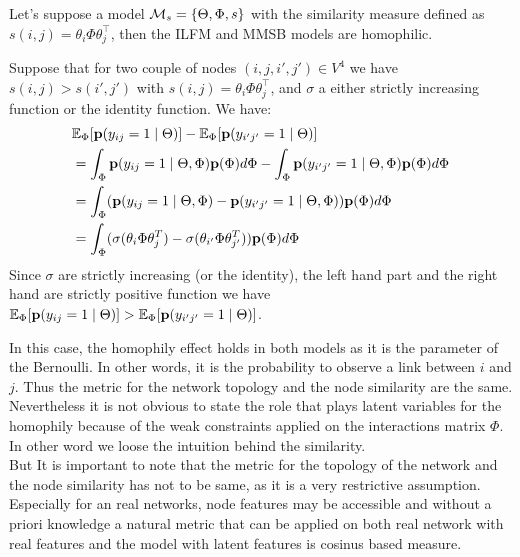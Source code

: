 \begin{proposition}[]
Let's suppose a model $ \mathcal{M}_s=\{\Theta, \Phi, s\}$ with the similarity measure defined as $s(i,j) = \theta_i \Phi \theta_j^\top$, then the ILFM and MMSB models are homophilic.
\end{proposition}

\begin{IEEEproof}
Suppose that for two couple of nodes $(i,j,i',j') \in V^4$ we have $s(i,j) > s(i',j')$ with $s(i,j) =\theta_i \Phi \theta_j^\top$, and $\sigma$ a either strictly increasing function or the identity function. We have:
\begin{align}
&\mathbb{E}_\Phi[\mathbf{p}(y_{ij}=1 \mid \Theta)] - \mathbb{E}_\Phi[\mathbf{p}(y_{i'j'} = 1  \mid \Theta)] \\
&= \int_{\Phi} \mathbf{p}(y_{ij}=1 \mid \Theta, \Phi ) \mathbf{p}(\Phi) d\Phi - \int_{\Phi}\mathbf{p}(y_{i'j'}=1 \mid \Theta, \Phi ) \mathbf{p}(\Phi) d\Phi \\
&= \int_\Phi ( \mathbf{p}(y_{ij}=1 \mid \Theta, \Phi )  - \mathbf{p}(y_{i'j'}=1 \mid \Theta, \Phi ) )\mathbf{p}(\Phi) d\Phi \\
&=  \int_\Phi ( \sigma(\theta_i \Phi  \theta_j^T) -\sigma(\theta_{i'} \Phi  \theta_{j'}^T) )\mathbf{p}(\Phi) d\Phi
\end{align}
Since $\sigma$ are strictly increasing (or the identity), the left hand part and the right hand are strictly positive function we have $\mathbb{E}_\Phi[\mathbf{p}(y_{ij}=1 \mid \Theta)] > \mathbb{E}_\Phi[\mathbf{p}(y_{i'j'} = 1  \mid \Theta)]$.~\\
\end{IEEEproof}

In this case, the homophily effect holds in both models as it is the parameter of the Bernoulli. In other words, it is the probability to observe a link between $i$ and $j$. Thus the metric for the network topology and the node similarity are the same. Nevertheless it is not obvious to state the role that plays latent variables for the homophily because of the weak constraints applied on the interactions matrix $\Phi$. In other word we loose the intuition behind the similarity. ~\\

But It is important to note that the metric for the topology of the network and the node similarity has not to be same, as it is a very restrictive assumption. Especially for an real networks, node features may be accessible and without a priori knowledge a natural metric that can be applied on both real network with real features and the model with latent features is cosinus based measure.~\\

